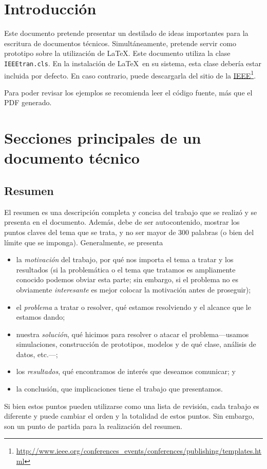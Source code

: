 \documentclass[twocolumn,11pts]{IEEEtran}
\begin{document}
\section{Introducción}
Este documento pretende presentar un destilado de ideas importantes para la escritura de documentos técnicos. Simultáneamente, pretende servir como prototipo sobre la utilización de \LaTeX. Este documento utiliza la clase \texttt{IEEEtran.cls}. En la instalación de \LaTeX\ en su sistema, esta clase debería estar incluida por defecto. En caso contrario, puede descargarla del sitio de la  \href{http://www.ieee.org/conferences_events/conferences/publishing/templates.html}{IEEE}\footnote{\url{http://www.ieee.org/conferences_events/conferences/publishing/templates.html}}.

Para poder revisar los ejemplos se recomienda leer el código fuente, más que el PDF generado.

\section{Secciones principales de un documento técnico}

\subsection{Resumen}
El resumen es una descripción completa y concisa del trabajo que se realizó y se presenta en el documento. Además, debe de ser autocontenido, mostrar los puntos claves del tema que se trata, y no ser mayor de 300 palabras (o bien del límite que se imponga). Generalmente, se presenta 
\begin{itemize}
\item la \emph{motivación} del trabajo, por qué nos importa el tema a tratar y los resultados (si la problemática o el tema que tratamos es ampliamente conocido podemos obviar esta parte; sin embargo, si el problema no es obviamente \emph{interesante} es mejor colocar la motivación antes de proseguir);
\item el \emph{problema} a tratar o resolver, qué estamos resolviendo y el alcance que le estamos dando;
\item nuestra \emph{solución}, qué hicimos para resolver o atacar el problema---usamos simulaciones, construcción de prototipos, modelos y de qué clase, análisis de datos, etc.---;
\item los \emph{resultados}, qué encontramos de interés que deseamos comunicar; y
\item la conclusión, que implicaciones tiene el trabajo que presentamos.
\end{itemize}
Si bien estos puntos pueden utilizarse como una lista de revisión, cada trabajo es diferente y puede cambiar el orden y la totalidad de estos puntos. Sin embargo, son un punto de partida para la realización del resumen.
\end{document}
